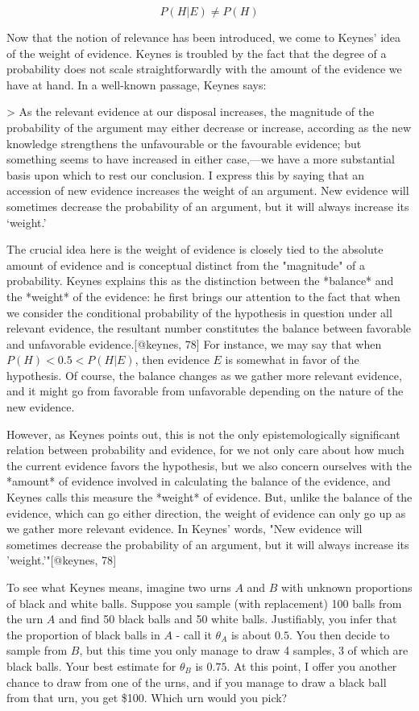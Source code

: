 \[P(H|E ) \neq P(H)\]

Now that the notion of relevance has been introduced, we come to Keynes'
idea of the weight of evidence. Keynes is troubled by the fact that the
degree of a probability does not scale straightforwardly with the amount
of the evidence we have at hand. In a well-known passage, Keynes says:

\textgreater{} As the relevant evidence at our disposal increases, the
magnitude of the probability of the argument may either decrease or
increase, according as the new knowledge strengthens the unfavourable or
the favourable evidence; but something seems to have increased in either
case,---we have a more substantial basis upon which to rest our
conclusion. I express this by saying that an accession of new evidence
increases the weight of an argument. New evidence will sometimes
decrease the probability of an argument, but it will always increase its
`weight.'

The crucial idea here is the weight of evidence is closely tied to the
absolute amount of evidence and is conceptual distinct from the
"magnitude" of a probability. Keynes explains this as the distinction
between the *balance* and the *weight* of the evidence: he first brings
our attention to the fact that when we consider the conditional
probability of the hypothesis in question under all relevant evidence,
the resultant number constitutes the balance between favorable and
unfavorable evidence.{[}@keynes, 78{]} For instance, we may say that
when \(P(H)<0.5 <P(H|E)\), then evidence \(E\) is somewhat in favor of
the hypothesis. Of course, the balance changes as we gather more
relevant evidence, and it might go from favorable from unfavorable
depending on the nature of the new evidence.

However, as Keynes points out, this is not the only epistemologically
significant relation between probability and evidence, for we not only
care about how much the current evidence favors the hypothesis, but we
also concern ourselves with the *amount* of evidence involved in
calculating the balance of the evidence, and Keynes calls this measure
the *weight* of evidence. But, unlike the balance of the evidence, which
can go either direction, the weight of evidence can only go up as we
gather more relevant evidence. In Keynes' words, "New evidence will
sometimes decrease the probability of an argument, but it will always
increase its 'weight.'"{[}@keynes, 78{]}

To see what Keynes means, imagine two urns \(A\) and \(B\) with unknown
proportions of black and white balls. Suppose you sample (with
replacement) 100 balls from the urn \(A\) and find 50 black balls and 50
white balls. Justifiably, you infer that the proportion of black balls
in \(A\) - call it \(\theta_A\) is about \(0.5\). You then decide to
sample from \(B\), but this time you only manage to draw 4 samples, 3 of
which are black balls. Your best estimate for \(\theta_B\) is \(0.75\).
At this point, I offer you another chance to draw from one of the urns,
and if you manage to draw a black ball from that urn, you get \$100.
Which urn would you pick?

